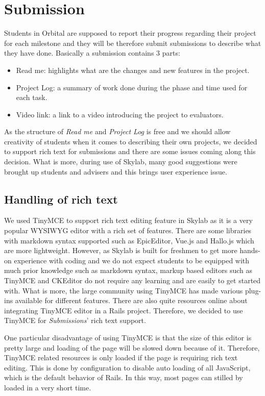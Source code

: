 \chapter{Submission}

Students in Orbital are supposed to report their progress regarding their project for each milestone and they will be therefore submit submissions to describe what they have done. Basically a submission contains 3 parts:

\begin{itemize}
  \item Read me: highlights what are the changes and new features in the project.
  \item Project Log: a summary of work done during the phase and time used for each task.
  \item Video link: a link to a video introducing the project to evaluators.
\end{itemize}

As the structure of \textit{Read me} and \textit{Project Log} is free and we should allow creativity of students when it comes to describing their own projects, we decided to support rich text for submissions and there are some issues coming along this decision. What is more, during use of Skylab, many good suggestions were brought up students and advisers and this brings user experience issue.

\section{Handling of rich text}
We used TinyMCE to support rich text editing feature in Skylab as it is a very popular WYSIWYG editor with a rich set of features\cite{citation10}. There are some libraries with markdown syntax supported such as EpicEditor, Vue.js and Hallo.js which are more lightweight. However, as Skylab is built for freshmen to get more hands-on experience with coding and we do not expect students to be equipped with much prior knowledge such as markdown syntax, markup based editors such as TinyMCE and CKEditor do not require any learning and are easily to get started with. What is more, the large community using TinyMCE has made various plug-ins available for different features. There are also quite resources online about integrating TinyMCE editor in a Rails project. Therefore, we decided to use TinyMCE for \textit{Submissions}' rich text support.

One particular disadvantage of using TinyMCE is that the size of this editor is pretty large and loading of the page will be slowed down because of it. Therefore, TinyMCE related resources is only loaded if the page is requiring rich text editing. This is done by configuration to disable auto loading of all JavaScript, which is the default behavior of Rails. In this way, most pages can stilled by loaded in a very short time.

